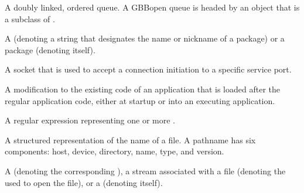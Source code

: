 \begin{glossary-list}

%
%
%
%
A doubly linked, ordered queue.  A GBBopen queue is headed by an object that
is a subclass of .


%
%
A  (denoting a string that designates the name or
nickname of a package) or a package (denoting itself).


%
%
A socket that is used to accept a connection initiation to a specific service
port.


\glent[patch]
%
%
%
A modification to the existing code of an application that is loaded after the
regular application code, either at startup or into an executing application.


%
%
%
%
A regular expression representing one or more .


\glent[pathname]
%
%
A structured representation of the name of a file. A pathname has six
components: host, device, directory, name, type, and version.


%

A  (denoting the corresponding ), a stream
associated with a file (denoting the  used to open the file),
or a  (denoting itself).



\end{glossary-list}
